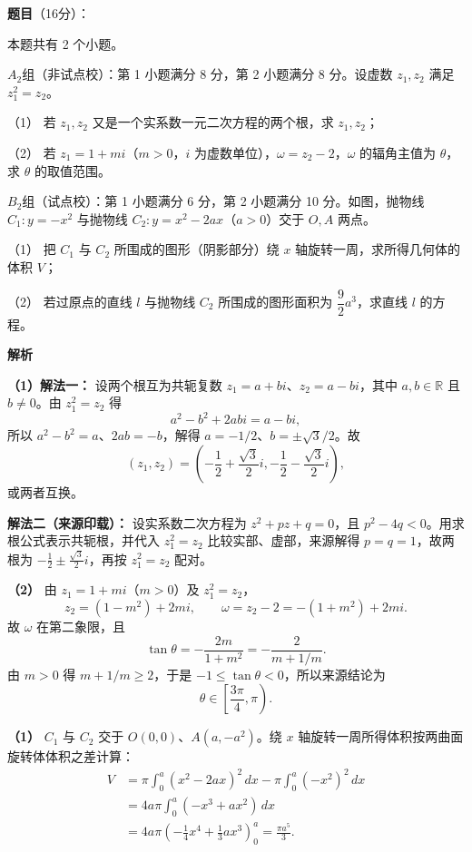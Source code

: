 \begin{answer}

\textbf{题目}（16分）：

本题共有 2 个小题。

$A_2$组（非试点校）：第 1 小题满分 8 分，第 2 小题满分 8 分。设虚数 $z_1,z_2$ 满足 $z_1^2=z_2$。

（1） 若 $z_1,z_2$ 又是一个实系数一元二次方程的两个根，求 $z_1,z_2$；

（2） 若 $z_1=1+mi$（$m>0$，$i$ 为虚数单位），$\omega=z_2-2$，$\omega$ 的辐角主值为 $\theta$，求 $\theta$ 的取值范围。

$B_2$组（试点校）：第 1 小题满分 6 分，第 2 小题满分 10 分。如图，抛物线 $C_1:y=-x^2$ 与抛物线 $C_2:y=x^2-2ax$（$a>0$）交于 $O,A$ 两点。

（1） 把 $C_1$ 与 $C_2$ 所围成的图形（阴影部分）绕 $x$ 轴旋转一周，求所得几何体的体积 $V$；

（2） 若过原点的直线 $l$ 与抛物线 $C_2$ 所围成的图形面积为 $\dfrac92a^3$，求直线 $l$ 的方程。
\nopagebreak[4]
\begin{center}\end{center}
\nopagebreak[4]
\textbf{解析}

\textbf{（1）解法一：} 设两个根互为共轭复数 $z_1=a+bi$、$z_2=a-bi$，其中 $a,b\in\mathbb R$ 且 $b\ne0$。由 $z_1^2=z_2$ 得
\nopagebreak[4]
\[a^2-b^2+2abi=a-bi,\]
所以 $a^2-b^2=a$、$2ab=-b$，解得 $a=-1/2$、$b=\pm\sqrt3/2$。故
\nopagebreak[4]
\[ (z_1,z_2)=\left(-\frac12+\frac{\sqrt3}{2}i,-\frac12-\frac{\sqrt3}{2}i\right),\]
或两者互换。

\textbf{解法二（来源印载）：} 设实系数二次方程为 $z^2+pz+q=0$，且 $p^2-4q<0$。用求根公式表示共轭根，并代入 $z_1^2=z_2$ 比较实部、虚部，来源解得 $p=q=1$，故两根为 $-\frac12\pm\frac{\sqrt3}{2}i$，再按 $z_1^2=z_2$ 配对。

\textbf{（2）} 由 $z_1=1+mi$（$m>0$）及 $z_1^2=z_2$，
\nopagebreak[4]
\[z_2=(1-m^2)+2mi,\qquad \omega=z_2-2=-(1+m^2)+2mi.\]
故 $\omega$ 在第二象限，且
\nopagebreak[4]
\[\tan\theta=-\frac{2m}{1+m^2}=-\frac{2}{m+1/m}.\]
由 $m>0$ 得 $m+1/m\ge2$，于是 $-1\le\tan\theta<0$，所以来源结论为
\nopagebreak[4]
\[\theta\in\left[\frac{3\pi}{4},\pi\right).\]

\textbf{（1）} $C_1$ 与 $C_2$ 交于 $O(0,0)$、$A(a,-a^2)$。绕 $x$ 轴旋转一周所得体积按两曲面旋转体体积之差计算：
\nopagebreak[4]
\[\begin{aligned}
V&=\pi\int_0^a(x^2-2ax)^2\,dx-\pi\int_0^a(-x^2)^2\,dx\\
&=4a\pi\int_0^a(-x^3+ax^2)\,dx\\
&=4a\pi\left(-\frac14x^4+\frac13ax^3\right)_0^a
=\frac{\pi a^5}{3}.
\end{aligned}\]


\end{answer}
